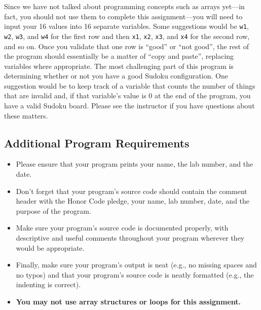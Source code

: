 Since we have not talked about programming concepts such as arrays yet---in fact, you should not use them to complete
this assignment---you will need to input your 16 values into 16 separate variables.  Some suggestions would be {\tt w1},
{\tt w2}, {\tt w3}, and {\tt w4} for the first row and then {\tt x1}, {\tt x2}, {\tt x3}, and {\tt x4} for the second
row, and so on.  Once you validate that one row is ``good'' or ``not good'', the rest of the program should essentially
be a matter of ``copy and paste'', replacing variables where appropriate.  The most challenging part of this program is
determining whether or not you have a good Sudoku configuration.  One suggestion would be to keep track of a variable
that counts the number of things that are invalid and, if that variable's value is 0 at the end of the program, you have
a valid Sudoku board. Please see the instructor if you have questions about these matters.

\vspace{-0.1in}
\subsection*{Additional Program Requirements}
\vspace{-0.05in}
\begin{itemize}

\itemsep0in

\item Please ensure that your program prints your name, the lab number, and the date.

\item Don't forget that your program's source code should contain the comment header with the Honor Code pledge, your
  name, lab number, date, and the purpose of the program.

\item Make sure your program's source code is documented properly, with descriptive and useful comments throughout your
  program wherever they would be appropriate.

\item Finally, make sure your program's output is neat (e.g., no missing spaces and no typos) and that your program's
  source code is neatly formatted (e.g., the indenting is correct).

\item \textbf{You may not use array structures or loops for this assignment.}

\end{itemize}

